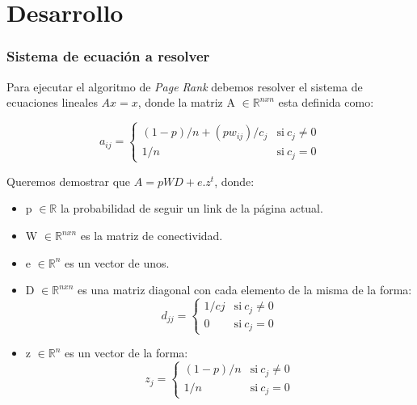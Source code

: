 \section{Desarrollo}

\subsubsection{Sistema de ecuación a resolver} %

Para ejecutar el algoritmo de \emph{Page Rank} debemos resolver el sistema de ecuaciones lineales $A x = x$, donde la matriz A $\in \mathbb{R}^{nxn}$ esta definida como:

\begin{equation}
    a_{ij} = \left\{
            \begin{array}{ll}
                 (1-p)/n + (pw_{ij})/c_j      & \mathrm{si\ } c_j \neq 0 \\
                 1/n & \mathrm{si\ } c_j = 0
            \end{array}
        \right.
\end{equation}

Queremos demostrar que $A = pWD + e.z^t$, donde:  
\begin{itemize}
	\item p $\in \mathbb{R}$ la probabilidad de seguir un link de la página actual.  
	\item W $\in \mathbb{R}^{nxn}$ es la matriz de conectividad.  
	\item e $\in \mathbb{R}^{n}$ es un vector de unos.
    \item D $\in \mathbb{R}^{nxn}$ es una matriz diagonal con cada elemento de la misma de la forma:     
    \begin{equation}
    	\label{defd}
        d_{jj} = \left\{
                \begin{array}{ll}
                     1/cj & \mathrm{si\ } c_j \neq 0 \\
                     0    & \mathrm{si\ } c_j = 0
                \end{array}
            \right.
    \end{equation}
    \item z $\in \mathbb{R}^{n}$ es un vector de la forma:  
    \begin{equation}
    	\label{defz}
        z_{j} = \left\{
                \begin{array}{ll}
                     (1-p)/n      & \mathrm{si\ } c_j \neq 0 \\
                     1/n & \mathrm{si\ } c_j = 0
                \end{array}
            \right.
    \end{equation}
\end{itemize}

